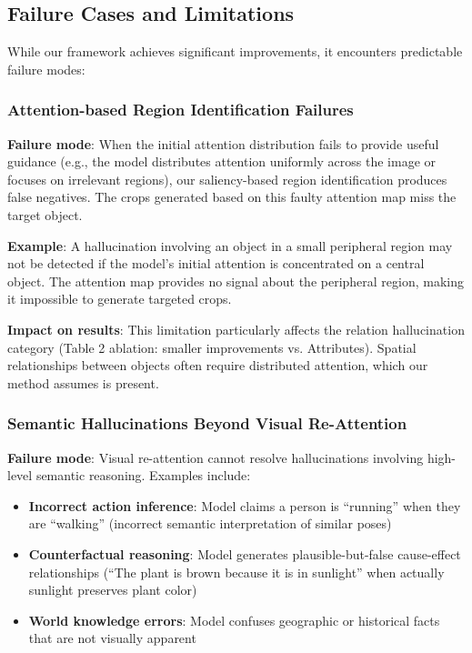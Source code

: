\documentclass[12pt]{article}
\begin{document}
\subsection{Failure Cases and Limitations}

While our framework achieves significant improvements, it encounters predictable 
failure modes:

\subsubsection{Attention-based Region Identification Failures}

\textbf{Failure mode}: When the initial attention distribution fails to provide 
useful guidance (e.g., the model distributes attention uniformly across the image 
or focuses on irrelevant regions), our saliency-based region identification produces 
false negatives. The crops generated based on this faulty attention map miss the 
target object.

\textbf{Example}: A hallucination involving an object in a small peripheral region 
may not be detected if the model's initial attention is concentrated on a central 
object. The attention map provides no signal about the peripheral region, making 
it impossible to generate targeted crops.

\textbf{Impact on results}: This limitation particularly affects the relation 
hallucination category (Table 2 ablation: smaller improvements vs. Attributes). 
Spatial relationships between objects often require distributed attention, which 
our method assumes is present.

\subsubsection{Semantic Hallucinations Beyond Visual Re-Attention}

\textbf{Failure mode}: Visual re-attention cannot resolve hallucinations involving 
high-level semantic reasoning. Examples include:
\begin{itemize}
    \item \textbf{Incorrect action inference}: Model claims a person is ``running'' 
    when they are ``walking'' (incorrect semantic interpretation of similar poses)
    \item \textbf{Counterfactual reasoning}: Model generates plausible-but-false 
    cause-effect relationships (``The plant is brown because it is in sunlight'' 
    when actually sunlight preserves plant color)
    \item \textbf{World knowledge errors}: Model confuses geographic or historical 
    facts that are not visually apparent
\end{itemize}
\end{document}
